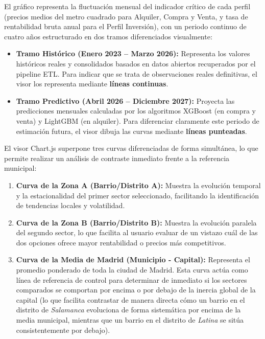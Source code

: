 \documentclass[a4paper,11pt,openany]{book}
\begin{document}
El gráfico representa la fluctuación mensual del indicador crítico de cada perfil (precios medios del metro cuadrado para Alquiler, Compra y Venta, y tasa de rentabilidad bruta anual para el Perfil Inversión), con un periodo continuo de cuatro años estructurado en dos tramos diferenciados visualmente:
\begin{itemize}
    \item \textbf{Tramo Histórico (Enero 2023 -- Marzo 2026):} Representa los valores históricos reales y consolidados basados en datos abiertos recuperados por el pipeline ETL. Para indicar que se trata de observaciones reales definitivas, el visor los representa mediante \textbf{líneas continuas}.
    \item \textbf{Tramo Predictivo (Abril 2026 -- Diciembre 2027):} Proyecta las predicciones mensuales calculadas por los algoritmos XGBoost (en compra y venta) y LightGBM (en alquiler). Para diferenciar claramente este periodo de estimación futura, el visor dibuja las curvas mediante \textbf{líneas punteadas}.
\end{itemize}

El visor Chart.js superpone tres curvas diferenciadas de forma simultánea, lo que permite realizar un análisis de contraste inmediato frente a la referencia municipal:
\begin{enumerate}
    \item \textbf{Curva de la Zona A (Barrio/Distrito A):} Muestra la evolución temporal y la estacionalidad del primer sector seleccionado, facilitando la identificación de tendencias locales y volatilidad.
    \item \textbf{Curva de la Zona B (Barrio/Distrito B):} Muestra la evolución paralela del segundo sector, lo que facilita al usuario evaluar de un vistazo cuál de las dos opciones ofrece mayor rentabilidad o precios más competitivos.
    \item \textbf{Curva de la Media de Madrid (Municipio - Capital):} Representa el promedio ponderado de toda la ciudad de Madrid. Esta curva actúa como línea de referencia de control para determinar de inmediato si los sectores comparados se comportan por encima o por debajo de la inercia global de la capital (lo que facilita contrastar de manera directa cómo un barrio en el distrito de \textit{Salamanca} evoluciona de forma sistemática por encima de la media municipal, mientras que un barrio en el distrito de \textit{Latina} se sitúa consistentemente por debajo).
\end{enumerate}
\end{document}
